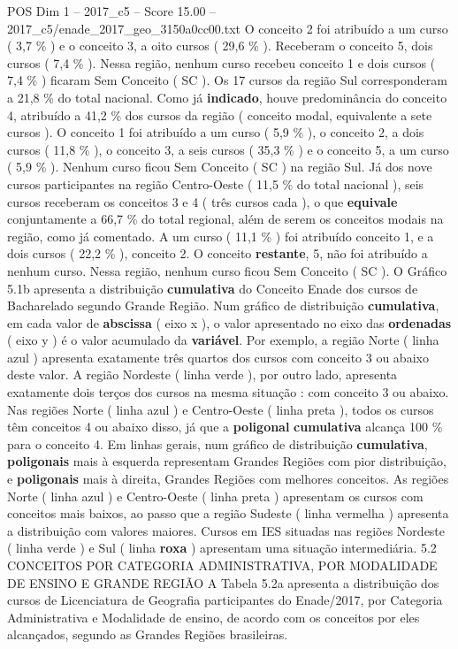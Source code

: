 \begin{textsample}{POS Dim 1 – 2017\_c5 – Score 15.00 – 2017\_c5/enade\_2017\_geo\_3150a0cc00.txt}
O conceito 2 foi atribuído a um curso ( 3,7 \% ) e o conceito 3, a oito cursos ( 29,6 \% ).
Receberam o conceito 5, dois cursos ( 7,4 \% ).
Nessa região, nenhum curso recebeu conceito 1 e dois cursos ( 7,4 \% ) ficaram Sem Conceito ( SC ).
Os 17 cursos da região Sul corresponderam a 21,8 \% do total nacional.
Como já \textbf{indicado}, houve predominância do conceito 4, atribuído a 41,2 \% dos cursos da região ( conceito modal, equivalente a sete cursos ).
O conceito 1 foi atribuído a um curso ( 5,9 \% ), o conceito 2, a dois cursos ( 11,8 \% ), o conceito 3, a seis cursos ( 35,3 \% ) e o conceito 5, a um curso ( 5,9 \% ).
Nenhum curso ficou Sem Conceito ( SC ) na região Sul.
Já dos nove cursos participantes na região Centro-Oeste ( 11,5 \% do total nacional ), seis cursos receberam os conceitos 3 e 4 ( três cursos cada ), o que \textbf{equivale} conjuntamente a 66,7 \% do total regional, além de serem os conceitos modais na região, como já comentado.
A um curso ( 11,1 \% ) foi atribuído conceito 1, e a dois cursos ( 22,2 \% ), conceito 2.
O conceito \textbf{restante}, 5, não foi atribuído a nenhum curso.
Nessa região, nenhum curso ficou Sem Conceito ( SC ).
O Gráfico 5.1b apresenta a distribuição \textbf{cumulativa} do Conceito Enade dos cursos de Bacharelado segundo Grande Região.
Num gráfico de distribuição \textbf{cumulativa}, em cada valor de \textbf{abscissa} ( eixo x ), o valor apresentado no eixo das \textbf{ordenadas} ( eixo y ) é o valor acumulado da \textbf{variável}.
Por exemplo, a região Norte ( linha azul ) apresenta exatamente três quartos dos cursos com conceito 3 ou abaixo deste valor.
A região Nordeste ( linha verde ), por outro lado, apresenta exatamente dois terços dos cursos na mesma situação : com conceito 3 ou abaixo.
Nas regiões Norte ( linha azul ) e Centro-Oeste ( linha preta ), todos os cursos têm conceitos 4 ou abaixo disso, já que a \textbf{poligonal} \textbf{cumulativa} alcança 100 \% para o conceito 4.
Em linhas gerais, num gráfico de distribuição \textbf{cumulativa}, \textbf{poligonais} mais à esquerda representam Grandes Regiões com pior distribuição, e \textbf{poligonais} mais à direita, Grandes Regiões com melhores conceitos.
As regiões Norte ( linha azul ) e Centro-Oeste ( linha preta ) apresentam os cursos com conceitos mais baixos, ao passo que a região Sudeste ( linha vermelha ) apresenta a distribuição com valores maiores.
Cursos em IES situadas nas regiões Nordeste ( linha verde ) e Sul ( linha \textbf{roxa} ) apresentam uma situação intermediária. 5.2 CONCEITOS POR CATEGORIA ADMINISTRATIVA, POR MODALIDADE DE ENSINO E GRANDE REGIÃO A Tabela 5.2a apresenta a distribuição dos cursos de Licenciatura de Geografia participantes do Enade/2017, por Categoria Administrativa e Modalidade de ensino, de acordo com os conceitos por eles alcançados, segundo as Grandes Regiões brasileiras.

\end{textsample}
